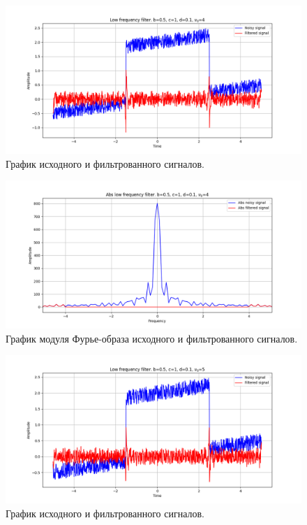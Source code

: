 \documentclass[a4paper, 12pt]{article}
\begin{document}
    \begin{figure}[!htb]
        \centering
        \includegraphics[scale=0.485]{13_u_flt_u_nolow.png}
        \captionsetup{skip=0pt}
        \caption{График исходного и фильтрованного сигналов.}
        \label{fig:fig51}
    \end{figure}
    \begin{figure}[!htb]
        \centering
        \includegraphics[scale=0.485]{13_abs_u_U_nolow.png}
        \captionsetup{skip=0pt}
        \caption{График модуля Фурье-образа исходного и фильтрованного сигналов.}
        \label{fig:fig52}
    \end{figure}
    \begin{figure}[!htb]
        \centering
        \includegraphics[scale=0.485]{14_u_flt_u_nolow.png}
        \captionsetup{skip=0pt}
        \caption{График исходного и фильтрованного сигналов.}
        \label{fig:fig53}
    \end{figure}
\end{document}
